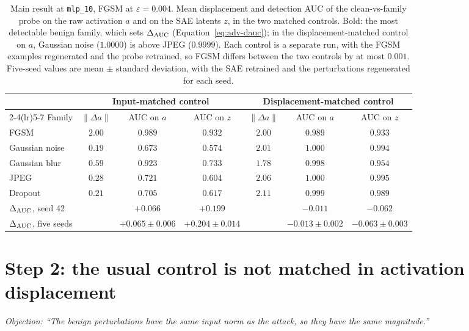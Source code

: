 \documentclass[../ppgc-tese.tex]{subfiles}
\begin{document}
\begin{table}[ht]
  \centering
  \caption{Main result at \texttt{mlp\_10}, FGSM at $\varepsilon{=}0.004$. Mean
  displacement and detection AUC of the clean-vs-family probe on the raw
  activation $a$ and on the SAE latents $z$, in the two matched controls. Bold:
  the most detectable benign family, which sets $\Delta_{\mathrm{AUC}}$
  (Equation~\eqref{eq:adv-dauc}); in the displacement-matched control on $a$,
  Gaussian noise ($1.0000$) is above JPEG ($0.9999$). Each control is a
  separate run, with the FGSM examples regenerated and the probe retrained, so
  FGSM differs between the two controls by at most $0.001$. Five-seed values
  are mean $\pm$ standard deviation, with the SAE retrained and the
  perturbations regenerated for each seed.}
  \label{tab:adv-main}
  \footnotesize
  \setlength{\tabcolsep}{3pt}
  \begin{tabular}{@{}lcccccc@{}}
    \toprule
     & \multicolumn{3}{c}{Input-matched control} & \multicolumn{3}{c}{Displacement-matched control} \\
    \cmidrule(lr){2-4}\cmidrule(lr){5-7}
    Family & $\lVert\Delta a\rVert$ & AUC on $a$ & AUC on $z$ & $\lVert\Delta a\rVert$ & AUC on $a$ & AUC on $z$ \\
    \midrule
    FGSM & $2.00$ & $0.989$ & $0.932$ & $2.00$ & $0.989$ & $0.933$ \\
    Gaussian noise & $0.19$ & $0.673$ & $0.574$ & $2.01$ & $\mathbf{1.000}$ & $0.994$ \\
    Gaussian blur & $0.59$ & $\mathbf{0.923}$ & $\mathbf{0.733}$ & $1.78$ & $0.998$ & $0.954$ \\
    JPEG & $0.28$ & $0.721$ & $0.604$ & $2.06$ & $1.000$ & $\mathbf{0.995}$ \\
    Dropout & $0.21$ & $0.705$ & $0.617$ & $2.11$ & $0.999$ & $0.989$ \\
    \midrule
    $\Delta_{\mathrm{AUC}}$, seed 42 & & $+0.066$ & $+0.199$ & & $-0.011$ & $-0.062$ \\
    $\Delta_{\mathrm{AUC}}$, five seeds & & $+0.065\pm0.006$ & $+0.204\pm0.014$ & & $-0.013\pm0.002$ & $-0.063\pm0.003$ \\
    \bottomrule
  \end{tabular}
\end{table}

\section{Step 2: the usual control is not matched in activation displacement}
\label{sec:adv-amplification}
\emph{Objection: ``The benign perturbations have the same input norm as the
attack, so they have the same magnitude.''}
\end{document}
